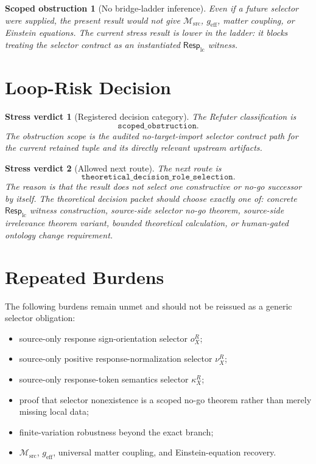 \documentclass[11pt]{article}
\newcommand{\Msrc}{\mathcal{M}_{\mathrm{src}}}
\newcommand{\RespLC}{\mathsf{Resp}_{\mathrm{lc}}}
\newcommand{\geff}{g_{\mathrm{eff}}}
\newtheorem{obstruction}{Scoped obstruction}
\newtheorem{verdict}{Stress verdict}
\begin{document}
\begin{obstruction}[No bridge-ladder inference]
Even if a future selector were supplied, the present result would not
give \(\Msrc\), \(\geff\), matter coupling, or Einstein equations.
The current stress result is lower in the ladder: it blocks treating
the selector contract as an instantiated \(\RespLC\) witness.
\end{obstruction}

\section{Loop-Risk Decision}

\begin{verdict}[Registered decision category]
The Refuter classification is
\[
    \texttt{scoped\_obstruction}.
\]
The obstruction scope is the audited no-target-import selector
contract path for the current retained tuple and its directly relevant
upstream artifacts.
\end{verdict}

\begin{verdict}[Allowed next route]
The next route is
\[
    \texttt{theoretical\_decision\_role\_selection}.
\]
The reason is that the result does not select one constructive or
no-go successor by itself. The theoretical decision packet should
choose exactly one of: concrete \(\RespLC\) witness construction,
source-side selector no-go theorem, source-side irrelevance theorem
variant, bounded theoretical calculation, or human-gated ontology
change requirement.
\end{verdict}

\section{Repeated Burdens}

The following burdens remain unmet and should not be reissued as a
generic selector obligation:
\begin{itemize}
    \item source-only response sign-orientation selector \(o^R_X\);
    \item source-only positive response-normalization selector
    \(\nu^R_X\);
    \item source-only response-token semantics selector \(\kappa^R_X\);
    \item proof that selector nonexistence is a scoped no-go theorem
    rather than merely missing local data;
    \item finite-variation robustness beyond the exact branch;
    \item \(\Msrc\), \(\geff\), universal matter coupling, and
    Einstein-equation recovery.
\end{itemize}
\end{document}
